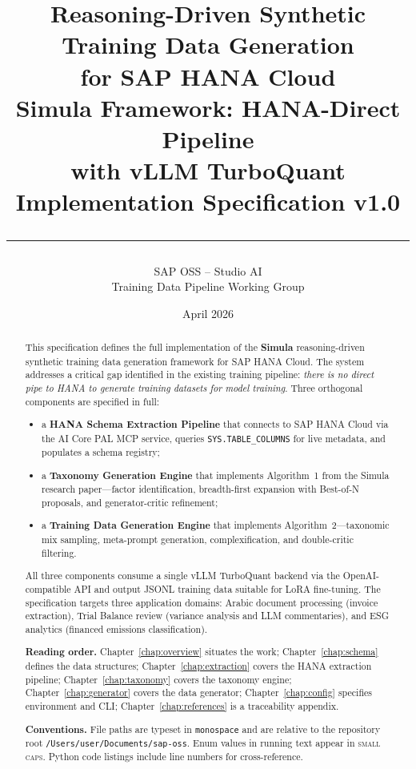 \documentclass[11pt,a4paper]{article}
\title{%
    \vspace{-1cm}
    {\LARGE\bfseries Reasoning-Driven Synthetic Training Data Generation}\\[0.3cm]
    {\Large for SAP HANA Cloud}\\[0.5cm]
    {\large Simula Framework: HANA-Direct Pipeline\\
    with vLLM TurboQuant}\\[0.3cm]
    {\normalsize Implementation Specification v1.0}\\[0.5cm]
    \rule{\textwidth}{1pt}
}
\author{%
    SAP OSS -- Studio AI\\
    \small Training Data Pipeline Working Group
}
\date{April 2026}
\begin{document}
\maketitle
\thispagestyle{empty}

\begin{abstract}
\noindent
This specification defines the full implementation of the \textbf{Simula} reasoning-driven
synthetic training data generation framework for SAP HANA Cloud. The system addresses a
critical gap identified in the existing training pipeline: \emph{there is no direct pipe
to HANA to generate training datasets for model training}. Three orthogonal components
are specified in full:

\begin{itemize}[nosep]
    \item a \textbf{HANA Schema Extraction Pipeline} that connects to SAP HANA Cloud via
          the AI Core PAL MCP service, queries \texttt{SYS.TABLE\_COLUMNS} for live metadata,
          and populates a schema registry;
    \item a \textbf{Taxonomy Generation Engine} that implements Algorithm~1 from the Simula
          research paper---factor identification, breadth-first expansion with Best-of-N
          proposals, and generator-critic refinement;
    \item a \textbf{Training Data Generation Engine} that implements Algorithm~2---taxonomic
          mix sampling, meta-prompt generation, complexification, and double-critic filtering.
\end{itemize}

\noindent
All three components consume a single vLLM TurboQuant backend via the OpenAI-compatible API
and output JSONL training data suitable for LoRA fine-tuning. The specification targets
three application domains: Arabic document processing (invoice extraction), Trial Balance
review (variance analysis and LLM commentaries), and ESG analytics (financed emissions
classification).

\medskip
\noindent\textbf{Reading order.} Chapter~\ref{chap:overview} situates the work;
Chapter~\ref{chap:schema} defines the data structures; Chapter~\ref{chap:extraction}
covers the HANA extraction pipeline; Chapter~\ref{chap:taxonomy} covers the taxonomy
engine; Chapter~\ref{chap:generator} covers the data generator; Chapter~\ref{chap:config}
specifies environment and CLI; Chapter~\ref{chap:references} is a traceability appendix.

\medskip
\noindent\textbf{Conventions.} File paths are typeset in \texttt{monospace} and are
relative to the repository root \texttt{/Users/user/Documents/sap-oss}. Enum values
in running text appear in \textsc{small caps}. Python code listings include line numbers
for cross-reference.
\end{abstract}
\end{document}
